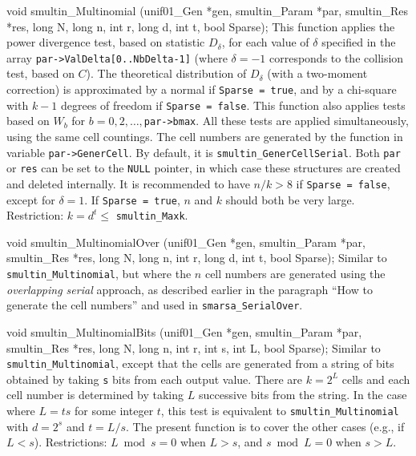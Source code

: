

\code

void smultin_Multinomial (unif01_Gen *gen, smultin_Param *par,
   smultin_Res *res, long N, long n, int r, long d, int t, bool Sparse);
\endcode
 \tab
  This function applies the power divergence
  test, based on
  statistic $D_\delta$, for each value of $\delta$ specified in the array
  {\tt par->ValDelta[0..NbDelta-1]} (where $\delta = -1$
  corresponds to the collision test, based on $C$).
  The theoretical distribution of $D_\delta$ (with a two-moment correction)
  is approximated by a normal if {\tt Sparse = true}, and by a chi-square
  with $k-1$ degrees of freedom if {\tt Sparse = false}.
  This function also applies tests based on $W_b$ for
  $b=0, 2,\dots, ${\tt par->bmax}.
  All these tests are applied simultaneously, using the same cell
  countings. The cell numbers are generated by the function in variable
  {\tt par->GenerCell}.
  By default, it is {\tt smultin\_GenerCellSerial}.
  Both {\tt par} or {\tt res} can be set to the {\tt NULL} pointer, in
  which case these structures are created and deleted internally.
  It is recommended to have $n/k > 8$ if {\tt Sparse = false},
  except for $\delta=1$.
  If {\tt Sparse = true}, $n$ and $k$ should both  be very large.
  Restriction: $k = d^t \le ${ \tt smultin\_Maxk}.
 \endtab
\code


void smultin_MultinomialOver (unif01_Gen *gen, smultin_Param *par,
   smultin_Res *res, long N, long n, int r, long d, int t, bool Sparse);
\endcode
 \tab
  Similar to {\tt smultin\_Multinomial}, but where the $n$ cell
  numbers are generated using the {\em overlapping serial\/} approach,
  as described earlier in the paragraph ``How to generate the cell numbers''
  and used in  {\tt smarsa\_SerialOver}.
 \endtab
\code


void smultin_MultinomialBits (unif01_Gen *gen, smultin_Param *par,
   smultin_Res *res, long N, long n, int r, int s, int L, bool Sparse);
\endcode
 \tab
  Similar to {\tt smultin\_Multinomial}, except that the cells are generated
  from a string of bits obtained by taking {\tt s} bits from each
  output value.  There are $k = 2^L$ cells
  and each cell number is determined by taking $L$ successive bits from
  the string.
  In the case where $L = ts$ for some integer $t$, this test is
  equivalent to {\tt smultin\_Multinomial} with $d = 2^s$ and $t = L/s$.
  The present function is to cover the other cases (e.g., if $L < s$).
  Restrictions:  $L \bmod s = 0$ when $L > s$, and
   $s \bmod L = 0$ when $s > L$.
 \endtab
\code



